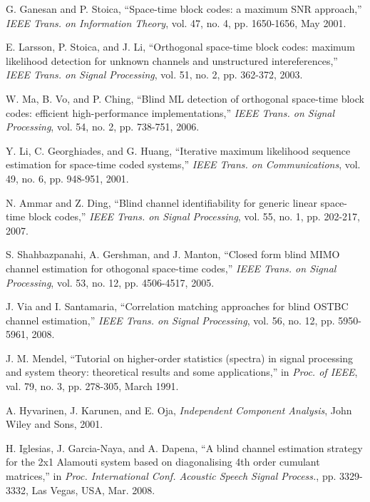 \documentclass[letterpaper,10pt]{article}
\begin{document}
\begin{thebibliography}{1}
    \setlength{\parskip}{2pt} %

   G. Ganesan and P. Stoica, ``Space-time block codes: a maximum SNR approach,'' \emph{IEEE Trans. on Information Theory}, vol. 47, no. 4, pp. 1650-1656, May 2001.

   E. Larsson, P. Stoica, and J. Li, ``Orthogonal space-time block codes: maximum likelihood detection for unknown channels and unstructured intereferences,'' \emph{IEEE Trans. on Signal Processing}, vol. 51, no. 2, pp. 362-372, 2003.

   W. Ma, B. Vo, and P. Ching, ``Blind ML detection of orthogonal space-time block codes: efficient high-performance implementations,'' \emph{IEEE Trans. on Signal Processing}, vol. 54, no. 2, pp. 738-751, 2006.

   Y. Li, C. Georghiades, and G. Huang, ``Iterative maximum likelihood sequence estimation for space-time coded systems,'' \emph{IEEE Trans. on Communications}, vol. 49, no. 6, pp. 948-951, 2001.

   N. Ammar and Z. Ding, ``Blind channel identifiability for generic linear space-time block codes,'' \emph{IEEE Trans. on Signal Processing}, vol. 55, no. 1, pp. 202-217, 2007.

   S. Shahbazpanahi, A. Gershman, and J. Manton, ``Closed form blind MIMO channel estimation for othogonal space-time codes,'' \emph{IEEE Trans. on Signal Processing}, vol. 53, no. 12, pp. 4506-4517, 2005.

   J. Via and I. Santamaria, ``Correlation matching approaches for blind OSTBC channel estimation,'' \emph{IEEE Trans. on Signal Processing}, vol. 56, no. 12, pp. 5950-5961, 2008.

   J. M. Mendel, ``Tutorial on higher-order statistics (spectra) in signal processing and system theory: theoretical results and some applications,'' in \emph{Proc. of IEEE}, val. 79, no. 3, pp. 278-305, March 1991.

   A. Hyvarinen, J. Karunen, and E. Oja, \emph{Independent Component Analysis}, John Wiley and Sons, 2001.

   H. Iglesias, J. Garcia-Naya, and A. Dapena, ``A blind channel estimation strategy for the 2x1 Alamouti system based on diagonalising 4th order cumulant matrices,'' in \emph{Proc. International Conf. Acoustic Speech Signal Process.}, pp. 3329-3332, Las Vegas, USA, Mar. 2008.


\end{thebibliography}
\end{document}
